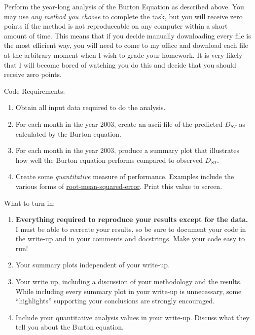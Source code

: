 \documentclass[12pt, letterpaper]{article}
\begin{document}
Perform the year-long analysis of the Burton Equation as described above.
You may use \emph{any method you choose} to complete the task, but you will
receive zero points if the method is not reproduceable on any computer within
a short amount of time.  This means that if you decide manually downloading
every file is the most efficient way, you will need to come to my office and
download each file at the arbitrary moment when I wish to grade your homework.
It is very likely that I will become bored of watching you do this and decide
that you should receive zero points.

\vspace{.5cm}
{\large Code Requirements:}
\noindent
\begin{enumerate}
\item Obtain all input data required to do the analysis.
\item For each month in the year 2003, create an ascii file of the predicted
  $D_{ST}$ as calculated by the Burton equation.
\item For each month in the year 2003, produce a summary plot that illustrates
  how well the Burton equation performs compared to observed $D_{ST}$.
\item Create some \emph{quantitative} measure of performance.  Examples include
  the various forms of
  \href{https://en.wikipedia.org/wiki/Root-mean-square_deviation}
       {root-mean-squared-error}.  Print this value to screen.
\end{enumerate}

\vspace{.5cm}
{\large What to turn in:}
\noindent
\begin{enumerate}
\item \textbf{Everything required to reproduce your results except for
the data.}  I must be able to recreate your results, so be sure to document
  your code in the write-up and in your comments and docstrings.  Make your code
  easy to run!
\item Your summary plots independent of your write-up.
\item Your write up, including a discussion of your methodology and the
results.  While including every summary plot in your write-up is unnecessary,
some ``highlights'' supporting your conclusions are strongly encouraged.
\item Include your quantitative analysis values in your write-up.  Discuss
  what they tell you about the Burton equation.
\end{enumerate}



\end{document}
